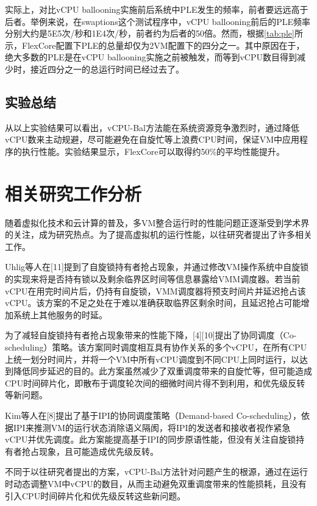 实际上，对比vCPU ballooning实施前后系统中PLE发生的频率，前者要远远高于后者。举例来说，在swaptions这个测试程序中，vCPU ballooning前后的PLE频率分别大约是5E5次/秒和1E4次/秒，前者约为后者的50倍。然而，根据\ref{tab:ple}所示，FlexCore配置下PLE的总量却仅为2VM配置下的四分之一。其中原因在于，绝大多数的PLE是在vCPU ballooning实施之前被触发，而等到vCPU数目得到减少时，接近四分之一的总运行时间已经过去了。

\subsection{实验总结}

从以上实验结果可以看出，vCPU-Bal方法能在系统资源竞争激烈时，通过降低vCPU数来主动规避，尽可能避免在自旋忙等上浪费CPU时间，保证VM中应用程序的执行性能。实验结果显示，FlexCore可以取得约50\%的平均性能提升。

\section{相关研究工作分析}

随着虚拟化技术和云计算的普及，多VM整合运行时的性能问题正逐渐受到学术界的关注，成为研究热点。为了提高虚拟机的运行性能，以往研究者提出了许多相关工作。

Uhlig等人在[11]提到了自旋锁持有者抢占现象，并通过修改VM操作系统中自旋锁的实现来将是否持有锁以及剩余临界区时间等信息暴露给VMM调度器。若当前vCPU在用完时间片后，仍持有自旋锁，VMM调度器将预支时间片并延迟抢占该vCPU。该方案的不足之处在于难以准确获取临界区剩余时间，且延迟抢占可能增加系统上其他服务的时延。

为了减轻自旋锁持有者抢占现象带来的性能下降，[4][10]提出了协同调度（Co-scheduling）策略。该方案同时调度相互具有协作关系的多个vCPU，在所有CPU上统一划分时间片，并将一个VM中所有vCPU调度到不同CPU上同时运行，以达到降低同步延迟的目的。此方案虽然减少了双重调度带来的自旋忙等，但可能造成CPU时间碎片化，即散布于调度轮次间的细微时间片得不到利用，和优先级反转等新问题。

Kim等人在[8]提出了基于IPI的协同调度策略（Demand-based Co-scheduling），依据IPI来推测VM的运行状态消除语义隔阂，将IPI的发送者和接收者视作紧急vCPU并优先调度。此方案能提高基于IPI的同步原语性能，但没有关注自旋锁持有者抢占现象，且可能造成优先级反转。

不同于以往研究者提出的方案，vCPU-Bal方法针对问题产生的根源，通过在运行时动态调整VM中vCPU的数目，从而主动避免双重调度带来的性能损耗，且没有引入CPU时间碎片化和优先级反转这些新问题。



